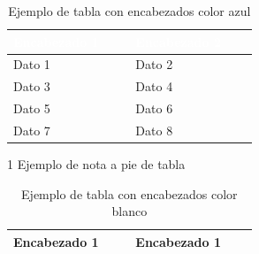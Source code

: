 \newpage

\begin{multicols}{2}

\begin{table}[H]

\caption{Ejemplo de tabla con encabezados color azul}
\label{tab:ejemplo_tabla_azul}

\begin{threeparttable}

{\small{}

\begin{tabular}{M{0.4\linewidth}M{0.4\linewidth}}\hline
    
    \sffamily\bfseries{}\textcolor{White}{Encabezado 1} & \sffamily\bfseries{}\textcolor{White}{Encabezado 2} \\ \hline
    
    Dato 1 & Dato 2 \\
    Dato 3 & Dato 4 \\
    Dato 5 & Dato 6 \\
    Dato 7 & Dato 8 \\

    \hline
\end{tabular}

}

\begin{tablenotes}\tiny %
    \item[1] Ejemplo de nota a pie de tabla
\end{tablenotes}

\end{threeparttable}
\end{table}



\begin{table}[H]

\caption{Ejemplo de tabla con encabezados color blanco}
\label{tab:ejemplo_tabla_blanco}

\begin{threeparttable}

{\small{}

\begin{tabular}{M{0.4\linewidth}M{0.4\linewidth}}\hline
    
    \sffamily\bfseries{}\textcolor{Primario}{Encabezado 1} & \sffamily\bfseries{}\textcolor{Primario}{Encabezado 1} \\ \hline
    

\end{tabular}}
\end{threeparttable}
\end{table}
\end{multicols}
